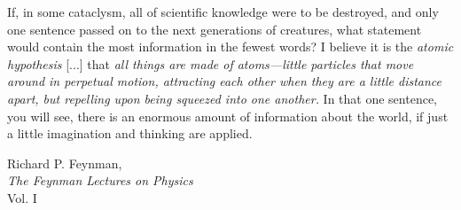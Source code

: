 \epigraph{If, in some cataclysm, all of scientific knowledge were
to be destroyed, and only one sentence passed on to the next generations
of creatures, what statement would contain the most information in the
fewest words? I believe it is the \textit{atomic hypothesis} [...]
that \textit{all things are made of atoms—little particles that move
around in perpetual motion, attracting each other when they are a little
distance apart, but repelling upon being squeezed into one another.}
In that one sentence, you will see, there is an enormous amount of
information about the world, if just a little imagination and
thinking are applied.}{Richard P. Feynman,\\\textit{The Feynman Lectures on Physics}\\Vol. I}